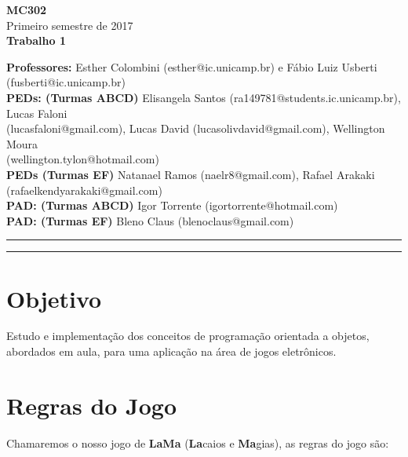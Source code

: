 \documentclass[10pt]{article}
\begin{document}

\begin{large}
	\begin{center}
		\textbf{MC302} \\
		Primeiro semestre de 2017 \\ \vspace{0.5cm}
		\textbf{Trabalho 1}
	\end{center}
\end{large}
\vspace{0.25cm}
\noindent \textbf{Professores:} Esther Colombini (esther@ic.unicamp.br) e Fábio Luiz Usberti (fusberti@ic.unicamp.br) \\
\textbf{PEDs: (Turmas ABCD)} Elisangela Santos (ra149781@students.ic.unicamp.br), Lucas Faloni\\ (lucasfaloni@gmail.com), Lucas David (lucasolivdavid@gmail.com), Wellington Moura\\ (wellington.tylon@hotmail.com) \\
\textbf{PEDs (Turmas EF)} Natanael Ramos (naelr8@gmail.com), Rafael Arakaki (rafaelkendyarakaki@gmail.com) \\
\textbf{PAD: (Turmas ABCD)} Igor Torrente (igortorrente@hotmail.com) \\
\textbf{PAD: (Turmas EF)} Bleno Claus (blenoclaus@gmail.com) \\

\hrule \hrule

\section{Objetivo}

Estudo e implementação dos conceitos de programação orientada a objetos, abordados em aula, para uma aplicação na área de jogos eletrônicos.

\section{Regras do Jogo}

Chamaremos o nosso jogo de \textbf{LaMa} (\textbf{La}caios e \textbf{Ma}gias), as regras do jogo são:
\end{document}
